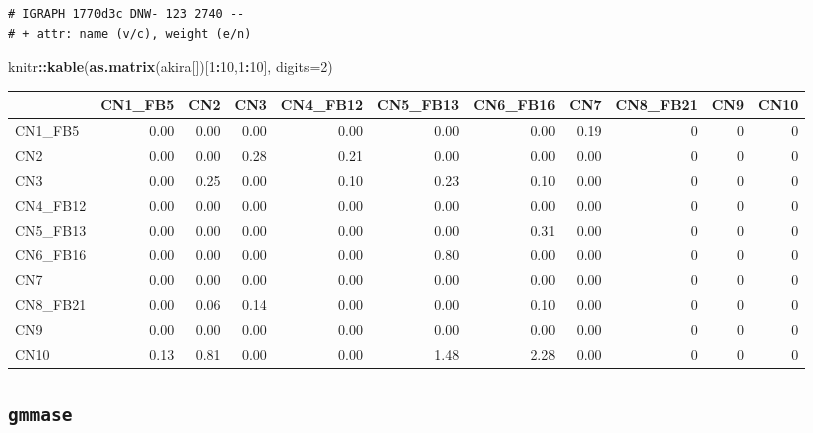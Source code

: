 \documentclass[]{article}
\newenvironment{Shaded}{\begin{snugshade}}{\end{snugshade}}
\newcommand{\KeywordTok}[1]{\textcolor[rgb]{0.13,0.29,0.53}{\textbf{#1}}}
\newcommand{\DataTypeTok}[1]{\textcolor[rgb]{0.13,0.29,0.53}{#1}}
\newcommand{\DecValTok}[1]{\textcolor[rgb]{0.00,0.00,0.81}{#1}}
\newcommand{\StringTok}[1]{\textcolor[rgb]{0.31,0.60,0.02}{#1}}
\newcommand{\CommentTok}[1]{\textcolor[rgb]{0.56,0.35,0.01}{\textit{#1}}}
\newcommand{\OperatorTok}[1]{\textcolor[rgb]{0.81,0.36,0.00}{\textbf{#1}}}
\newcommand{\NormalTok}[1]{#1}
\begin{document}
\begin{verbatim}
# IGRAPH 1770d3c DNW- 123 2740 -- 
# + attr: name (v/c), weight (e/n)
\end{verbatim}

\begin{Shaded}
\begin{Highlighting}[]
\NormalTok{knitr}\OperatorTok{::}\KeywordTok{kable}\NormalTok{(}\KeywordTok{as.matrix}\NormalTok{(akira[])[}\DecValTok{1}\OperatorTok{:}\DecValTok{10}\NormalTok{,}\DecValTok{1}\OperatorTok{:}\DecValTok{10}\NormalTok{], }\DataTypeTok{digits=}\DecValTok{2}\NormalTok{)}
\end{Highlighting}
\end{Shaded}

\begin{longtable}[]{@{}lrrrrrrrrrr@{}}
\toprule
& CN1\_FB5 & CN2 & CN3 & CN4\_FB12 & CN5\_FB13 & CN6\_FB16 & CN7 &
CN8\_FB21 & CN9 & CN10\tabularnewline
\midrule
\endhead
CN1\_FB5 & 0.00 & 0.00 & 0.00 & 0.00 & 0.00 & 0.00 & 0.19 & 0 & 0 &
0\tabularnewline
CN2 & 0.00 & 0.00 & 0.28 & 0.21 & 0.00 & 0.00 & 0.00 & 0 & 0 &
0\tabularnewline
CN3 & 0.00 & 0.25 & 0.00 & 0.10 & 0.23 & 0.10 & 0.00 & 0 & 0 &
0\tabularnewline
CN4\_FB12 & 0.00 & 0.00 & 0.00 & 0.00 & 0.00 & 0.00 & 0.00 & 0 & 0 &
0\tabularnewline
CN5\_FB13 & 0.00 & 0.00 & 0.00 & 0.00 & 0.00 & 0.31 & 0.00 & 0 & 0 &
0\tabularnewline
CN6\_FB16 & 0.00 & 0.00 & 0.00 & 0.00 & 0.80 & 0.00 & 0.00 & 0 & 0 &
0\tabularnewline
CN7 & 0.00 & 0.00 & 0.00 & 0.00 & 0.00 & 0.00 & 0.00 & 0 & 0 &
0\tabularnewline
CN8\_FB21 & 0.00 & 0.06 & 0.14 & 0.00 & 0.00 & 0.10 & 0.00 & 0 & 0 &
0\tabularnewline
CN9 & 0.00 & 0.00 & 0.00 & 0.00 & 0.00 & 0.00 & 0.00 & 0 & 0 &
0\tabularnewline
CN10 & 0.13 & 0.81 & 0.00 & 0.00 & 1.48 & 2.28 & 0.00 & 0 & 0 &
0\tabularnewline
\bottomrule
\end{longtable}

\begin{Shaded}
\end{Shaded}

\subsection{\texorpdfstring{\texttt{gmmase}}{gmmase}}\label{gmmase}
\end{document}
